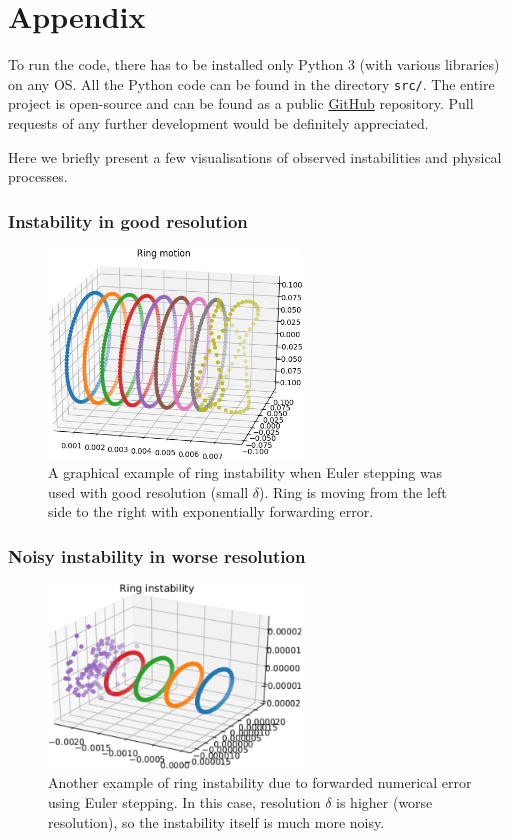 \chapter{Appendix}

To run the code, there has to be installed only Python 3 (with various libraries) on any OS. All the Python code can be found in the directory \texttt{src/}. The entire project is open-source and can be found as a public \href{https://github.com/KuboBahyl/superfluid}{GitHub} repository. Pull requests of any further development would be definitely appreciated.

Here we briefly present a few visualisations of observed instabilities and physical processes.

\subsection*{Instability in good resolution}


\begin{figure}[h]
	\centering
	\includegraphics[width=0.6\textwidth]{graphics/results/euler_instability}
	\caption{A graphical example of ring instability when Euler stepping was used with good resolution (small $\delta$). Ring is moving from the left side to the right with exponentially forwarding error.}
\end{figure}

\subsection*{Noisy instability in worse resolution}

\begin{figure}[h]
	\centering
	\includegraphics[width=0.6\textwidth]{graphics/results/ring-instability}
	\caption{Another example of ring instability due to forwarded numerical error using Euler stepping. In this case, resolution $\delta$ is higher (worse resolution), so the instability itself is much more noisy.}
\end{figure}

